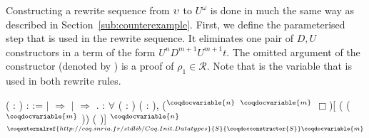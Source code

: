 Constructing a rewrite sequence from $\upsilon$ to $U^\omega$ is done in
much the same way as described in
Section~\ref{sub:counterexample}. First, we define the parameterised
step that is used in the rewrite sequence. It eliminates one pair of $D,
U$ constructors in a term of the form $U^n D^{m+1} U^{m+1} t$. The
omitted argument of the 
constructor (denoted by \coqdoclemma{\_}) is a proof of $\rho_1 \in
\mathcal{R}$. Note that  is the variable that is
used in both rewrite rules.
\begin{singlespace}
\begin{coqdoccode}
\coqdocnoindent
{}
 ( :
) :
 :=\coqdoceol
\coqdocindent{1.00em}
    \coqdoceol
\coqdocindent{1.00em}
\ensuremath{|}  \ensuremath{\Rightarrow}
\coqdoceol
\coqdocindent{1.00em}
\ensuremath{|}  \ensuremath{\Rightarrow}
\coqdoceol
\coqdocindent{1.00em}
.\coqdoceol
\coqdocemptyline
\coqdocnoindent
{}
:
\ensuremath{\forall} (  :
)
( :
),\coqdoceol
\coqdocindent{1.00em}
($^\coqdocvariable{n}$
$^\coqdocvariable{m}$
$\Box$)[
  (
($^\coqdocvariable{m}$
    )) (
)] 
$^\coqdocvariable{n}$
$^{\coqexternalref{http://coq.inria.fr/stdlib/Coq.Init.Datatypes}{S}{\coqdocconstructor{S}} \coqdocvariable{m}}$

\end{coqdoccode}
\end{singlespace}
